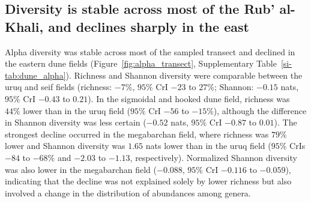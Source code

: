 \documentclass[fleqn,10pt,numbers]{olplainarticle}
\begin{document}


\subsection*{Diversity is stable across most of the Rub' al-Khali, and declines sharply in the east}

Alpha diversity was stable across most of the sampled transect and declined in the eastern dune fields (Figure~\ref{fig:alpha_transect}, Supplementary Table~\ref{si-tab:dune_alpha}). Richness and Shannon diversity were comparable between the uruq and seif fields (richness: $-7\%$, $95\%$ CrI $-23$ to $27\%$; Shannon: $-0.15$ nats, $95\%$ CrI $-0.43$ to $0.21$). In the sigmoidal and hooked dune field, richness was $44\%$ lower than in the uruq field ($95\%$ CrI $-56$ to $-15\%$), although the difference in Shannon diversity was less certain ($-0.52$ nats, $95\%$ CrI $-0.87$ to $0.01$). The strongest decline occurred in the megabarchan field, where richness was $79\%$ lower and Shannon diversity was $1.65$ nats lower than in the uruq field ($95\%$ CrIs $-84$ to $-68\%$ and $-2.03$ to $-1.13$, respectively). Normalized Shannon diversity was also lower in the megabarchan field ($-0.088$, $95\%$ CrI $-0.116$ to $-0.059$), indicating that the decline was not explained solely by lower richness but also involved a change in the distribution of abundances among genera.
\end{document}

